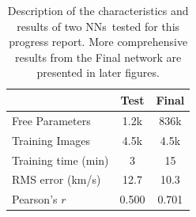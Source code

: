 \documentclass[10pt,letterpaper, doublespace]{article}
\newcommand{\NNs}{\acp{NN}}
\begin{document}
			\begin{table}[t!]
				
				\centering
				\begin{tabular}{| l | c c |}
					\hline
					& Test & Final \\ \hline
					Free Parameters & 1.2k & 836k \\
					Training Images & 4.5k & 4.5k \\				
					Training time (min) & 3 & 15 \\ 
					RMS error (km/s) & 12.7 & 10.3 \\
					Pearson's $r$ & 0.500 & 0.701 \\ \hline				
				\end{tabular}					
				\caption{Description of the characteristics and results of two \NNs\ tested for this progress report. More comprehensive results from the Final network are presented in later figures.}
				\label{nn_table}
				
			\end{table}
		
\end{document}
